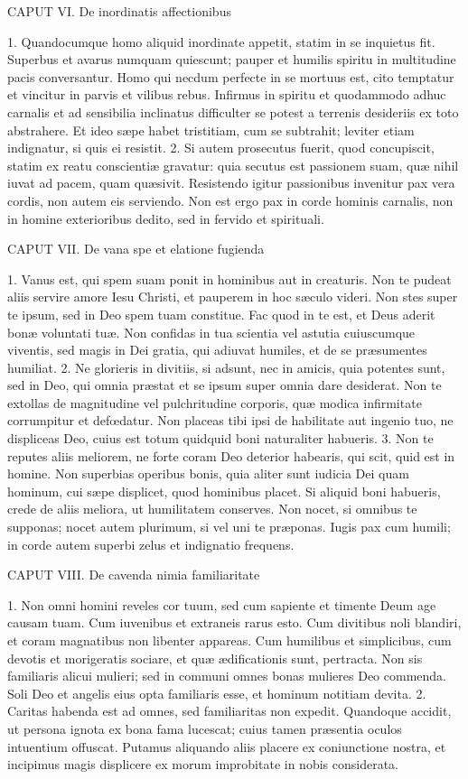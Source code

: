 \documentclass[twoside]{article}
\begin{document}
CAPUT VI.
De inordinatis affectionibus

1. Quandocumque homo aliquid inordinate appetit, statim in se inquietus fit. Superbus et avarus numquam quiescunt; pauper et humilis spiritu in multitudine pacis conversantur. Homo qui necdum perfecte in se mortuus est, cito temptatur et vincitur in parvis et vilibus rebus. Infirmus in spiritu et quodammodo adhuc carnalis et ad sensibilia inclinatus difficulter se potest a terrenis desideriis ex toto abstrahere. Et ideo sæpe habet tristitiam, cum se subtrahit; leviter etiam indignatur, si quis ei resistit.
2. Si autem prosecutus fuerit, quod concupiscit, statim ex reatu conscientiæ gravatur: quia secutus est passionem suam, quæ nihil iuvat ad pacem, quam quæsivit. Resistendo igitur passionibus invenitur pax vera cordis, non autem eis serviendo. Non est ergo pax in corde hominis carnalis, non in homine exterioribus dedito, sed in fervido et spirituali.


CAPUT VII.
De vana spe et elatione fugienda

1. Vanus est, qui spem suam ponit in hominibus aut in creaturis. Non te pudeat aliis servire amore Iesu Christi, et pauperem in hoc sæculo videri. Non stes super te ipsum, sed in Deo spem tuam constitue. Fac quod in te est, et Deus aderit bonæ voluntati tuæ. Non confidas in tua scientia vel astutia cuiuscumque viventis, sed magis in Dei gratia, qui adiuvat humiles, et de se præsumentes humiliat.
2. Ne glorieris in divitiis, si adsunt, nec in amicis, quia potentes sunt, sed in Deo, qui omnia præstat et se ipsum super omnia dare desiderat. Non te extollas de magnitudine vel pulchritudine corporis, quæ modica infirmitate corrumpitur et defœdatur. Non placeas tibi ipsi de habilitate aut ingenio tuo, ne displiceas Deo, cuius est totum quidquid boni naturaliter habueris.
3. Non te reputes aliis meliorem, ne forte coram Deo deterior habearis, qui scit, quid est in homine. Non superbias operibus bonis, quia aliter sunt iudicia Dei quam hominum, cui sæpe displicet, quod hominibus placet. Si aliquid boni habueris, crede de aliis meliora, ut humilitatem conserves. Non nocet, si omnibus te supponas; nocet autem plurimum, si vel uni te præponas. Iugis pax cum humili; in corde autem superbi zelus et indignatio frequens.


CAPUT VIII.
De cavenda nimia familiaritate

1. Non omni homini reveles cor tuum, sed cum sapiente et timente Deum age causam tuam. Cum iuvenibus et extraneis rarus esto. Cum divitibus noli blandiri, et coram magnatibus non libenter appareas. Cum humilibus et simplicibus, cum devotis et morigeratis sociare, et quæ ædificationis sunt, pertracta. Non sis familiaris alicui mulieri; sed in communi omnes bonas mulieres Deo commenda. Soli Deo et angelis eius opta familiaris esse, et hominum notitiam devita.
2. Caritas habenda est ad omnes, sed familiaritas non expedit. Quandoque accidit, ut persona ignota ex bona fama lucescat; cuius tamen præsentia oculos intuentium offuscat. Putamus aliquando aliis placere ex coniunctione nostra, et incipimus magis displicere ex morum improbitate in nobis considerata.
\end{document}
